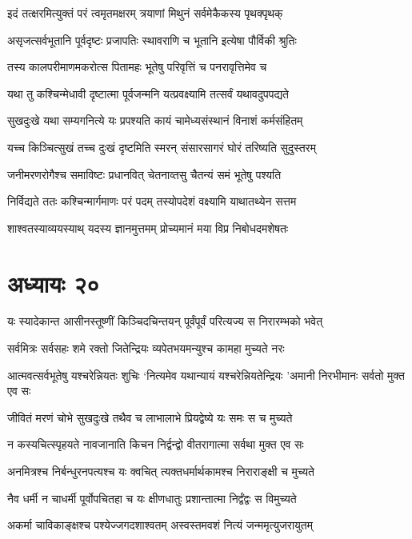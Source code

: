 \twolineshloka
{इदं तत्क्षरमित्युक्तं परं त्वमृतमक्षरम्}
{त्रयाणां मिथुनं सर्वमेकैकस्य पृथक्पृथक्}


\twolineshloka
{असृजत्सर्वभूतानि पूर्वदृष्टः प्रजापतिः}
{स्थावराणि च भूतानि इत्येषा पौर्विकी श्रुतिः}


\twolineshloka
{तस्य कालपरीमाणमकरोत्स पितामहः}
{भूतेषु परिवृत्तिं च पनरावृत्तिमेव च}


\twolineshloka
{यथा तु कश्चिन्मेधावी दृष्टात्मा पूर्वजन्मनि}
{यत्प्रवक्ष्यामि तत्सर्वं यथावदुपपद्यते}


\twolineshloka
{सुखदुःखे यथा सम्यगनित्ये यः प्रपश्यति}
{कायं चामेध्यसंस्थानं विनाशं कर्मसंहितम्}


\twolineshloka
{यच्च किञ्चित्सुखं तच्च दुःखं दृष्टमिति स्मरन्}
{संसारसागरं घोरं तरिष्यति सुदुस्तरम्}


\twolineshloka
{जनीमरणरोगैश्च समाविष्टः प्रधानवित्}
{चेतनाव्तसु चैतन्यं समं भूतेषु पश्यति}


\twolineshloka
{निर्विद्यते ततः कश्चिन्मार्गमाणः परं पदम्}
{तस्योपदेशं वक्ष्यामि याथातथ्येन सत्तम}


\twolineshloka
{शाश्वतस्याव्ययस्याथ् यदस्य ज्ञानमुत्तमम्}
{प्रोच्यमानं मया विप्र निबोधदमशेषतः}


\chapter{अध्यायः २०}
\twolineshloka
{यः स्यादेकान्त आसीनस्तूष्णीं किञ्चिदचिन्तयन्}
{पूर्वंपूर्वं परित्यज्य स निरारम्भको भवेत्}


\twolineshloka
{सर्वमित्रः सर्वसहः शमे रक्तो जितेन्द्रियः}
{व्यपेतभयमन्युश्च कामहा मुच्यते नरः}


\threelineshloka
{आत्मवत्सर्वभूतेषु यश्चरेन्नियतः शुचिः}
{`नित्यमेव यथान्यायं यश्चरेन्नियतेन्द्रियः}
{'अमानी निरभीमानः सर्वतो मुक्त एव सः}


\twolineshloka
{जीवितं मरणं चोभे सुखदुःखे तथैव च}
{लाभालाभे प्रियद्वेष्ये यः समः स च मुच्यते}


\twolineshloka
{न कस्यचित्स्पृहयते नावजानाति किचन}
{निर्द्वन्द्वो वीतरागात्मा सर्वथा मुक्त एव सः}


\twolineshloka
{अनमित्रश्च निर्बन्धुरनपत्यश्च यः क्वचित्}
{त्यक्तधर्मार्थकामश्च निराराङ्क्षी च मुच्यते}


\twolineshloka
{नैव धर्मी न चाधर्मी पूर्वोपचितहा च यः}
{क्षीणधातुः प्रशान्तात्मा निर्द्वंद्वः स विमुच्यते}


\twolineshloka
{अकर्मा चाविकाङ्क्षश्च पश्येज्जगदशाश्वतम्}
{अस्वस्तमवशं नित्यं जन्ममृत्युजरायुतम्}


